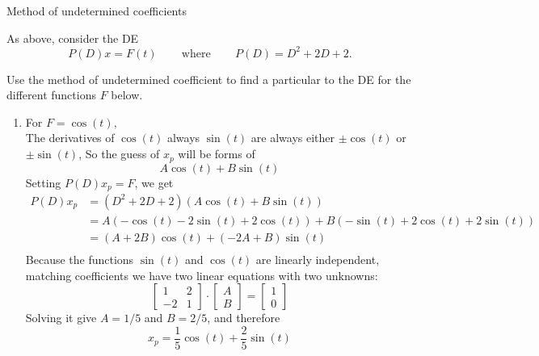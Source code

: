 \begin{problem}
  Method of undetermined coefficients
\end{problem}

As above, consider the DE
\begin{equation*}
  P(D)x=F(t)\,  \qquad \text {where}\,  \qquad P(D)=D^2+2D+2.
\end{equation*}

Use the method of undetermined coefficient to find a particular to the DE
for the different functions $F$ below.

\begin{enumerate}
\item For $F=\cos (t),$ \\
  The derivatives of $\cos (t)$ always $\sin⁡(t)$ are always
  either $\pm \cos⁡ (t)$ or $\pm \sin⁡ (t)$,
  So the guess of $x_p$ will be forms of 
  \begin{equation*}
    A \cos (t) + B \sin (t) 
  \end{equation*}
  Setting $P(D)x_ p= F$, we get
  \begin{align*}
    P(D)x_p
    &= (D^2+2D+2) \left( A \cos (t) + B \sin (t) \right) \\
    &= A \left(- \cos (t) -2 \sin(t) + 2 \cos (t) \right)
      + B \left(- \sin (t) +2 \cos(t) + 2 \sin (t) \right) \\
    &= (A + 2B) \cos (t) + (-2A + B) \sin (t) \\    
  \end{align*}
  Because the functions $\sin⁡ (t)$ and $\cos⁡ (t)$ are linearly independent,
  matching coefficients we have two linear equations with two unknowns:
  \[
    \begin{bmatrix}
      1 & 2 \\
      -2 & 1
    \end{bmatrix}
    \cdot
    \begin{bmatrix}
      A \\
      B
    \end{bmatrix}
    =
    \begin{bmatrix}
      1 \\
      0
    \end{bmatrix}
  \]
  Solving it give $A = 1/5$ and $B = 2/5$, and therefore
  \begin{equation*}
    x _p = \frac{1}{5} \cos (t) + \frac{2}{5} \sin(t) 
  \end{equation*}


\end{enumerate}
